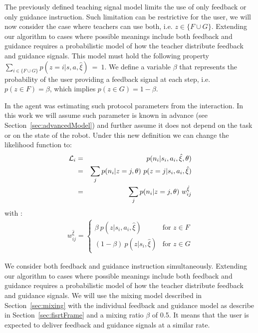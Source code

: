The previously defined teaching signal model limits the use of only feedback or only guidance instruction. Such limitation can be restrictive for the user, we will now consider the case where teachers can use both, i.e. $z \in \{F \cup G\}$. Extending our algorithm to cases where possible meanings include both feedback and guidance requires a probabilistic model of how the teacher distribute feedback and guidance signals. This model must hold the following property $\sum_{i \in \{F \cup G\}} p(z = i|s,a,\hat{\xi})~=~1$. We define a variable $\beta$ that represents the probability of the user providing a feedback signal at each step, i.e. $p(z \in F) = \beta$, which implies $p(z \in G) = 1 - \beta$. 

In \cite{macl11simul} the agent was estimating such protocol parameters from the interaction. In this work we will assume such parameter is known in advance (see Section~\ref{sec:advancedModel}) and further assume it does not depend on the task or on the state of the robot. 
%
Under this new definition we can change the likelihood function to:
%
\begin{eqnarray}
\mathcal{L}_i &=&  p(n_i|s_i,a_i,\hat{\xi},\theta)\nonumber\\
                &=& \sum_{j} p(n_i|z = j,\theta)~p(z = j|s_i,a_i,\hat{\xi}) \nonumber\\
                &=& \sum_{j} p(n_i|z = j,\theta)~w_{ij}^{\hat{\xi}}
                \label{eq:likmix}
\end{eqnarray}
%
with :
%
\begin{eqnarray}
    w_{ij}^{\hat{\xi}} = 
        \begin{cases} 
            \beta~p(z|s_i,a_i,\hat{\xi}) &\mbox{for } z \in F \\
            (1- \beta)~p(z|s_i,\hat{\xi}) & \mbox{for } z \in G
        \end{cases} 
\end{eqnarray}

We consider both feedback and guidance instruction simultaneously. Extending our algorithm to cases where possible meanings include both feedback and guidance requires a probabilistic model of how the teacher distribute feedback and guidance signals. We will use the mixing model described in Section~\ref{sec:mixing} with the individual feedback and guidance model as describe in Section~\ref{sec:fisrtFrame} and a mixing ratio $\beta$ of 0.5. It means that the user is expected to deliver feedback and guidance signals at a similar rate.


